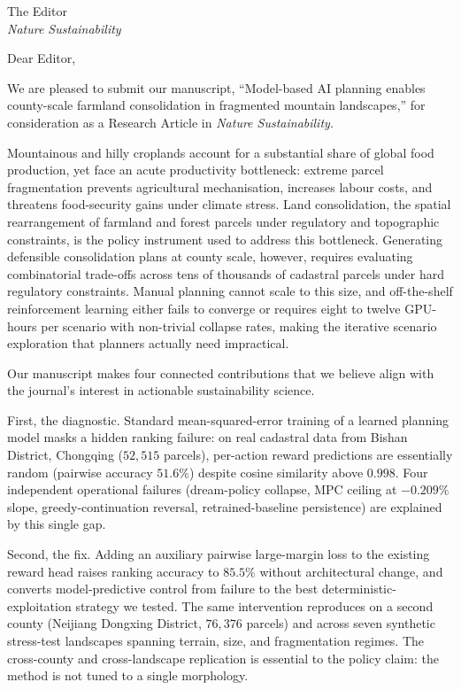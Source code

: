 \documentclass[11pt]{letter}
\begin{document}
\begin{letter}{The Editor \\ \textit{Nature Sustainability}}

\opening{Dear Editor,}

We are pleased to submit our manuscript, ``Model-based AI planning enables county-scale farmland consolidation in fragmented mountain landscapes,'' for consideration as a Research Article in \textit{Nature Sustainability}.

Mountainous and hilly croplands account for a substantial share of global food production, yet face an acute productivity bottleneck: extreme parcel fragmentation prevents agricultural mechanisation, increases labour costs, and threatens food-security gains under climate stress. Land consolidation, the spatial rearrangement of farmland and forest parcels under regulatory and topographic constraints, is the policy instrument used to address this bottleneck. Generating defensible consolidation plans at county scale, however, requires evaluating combinatorial trade-offs across tens of thousands of cadastral parcels under hard regulatory constraints. Manual planning cannot scale to this size, and off-the-shelf reinforcement learning either fails to converge or requires eight to twelve GPU-hours per scenario with non-trivial collapse rates, making the iterative scenario exploration that planners actually need impractical.

Our manuscript makes four connected contributions that we believe align with the journal's interest in actionable sustainability science.

First, the diagnostic. Standard mean-squared-error training of a learned planning model masks a hidden ranking failure: on real cadastral data from Bishan District, Chongqing ($52{,}515$ parcels), per-action reward predictions are essentially random (pairwise accuracy $51.6\%$) despite cosine similarity above $0.998$. Four independent operational failures (dream-policy collapse, MPC ceiling at $-0.209\%$ slope, greedy-continuation reversal, retrained-baseline persistence) are explained by this single gap.

Second, the fix. Adding an auxiliary pairwise large-margin loss to the existing reward head raises ranking accuracy to $85.5\%$ without architectural change, and converts model-predictive control from failure to the best deterministic-exploitation strategy we tested. The same intervention reproduces on a second county (Neijiang Dongxing District, $76{,}376$ parcels) and across seven synthetic stress-test landscapes spanning terrain, size, and fragmentation regimes. The cross-county and cross-landscape replication is essential to the policy claim: the method is not tuned to a single morphology.


\end{letter}
\end{document}
